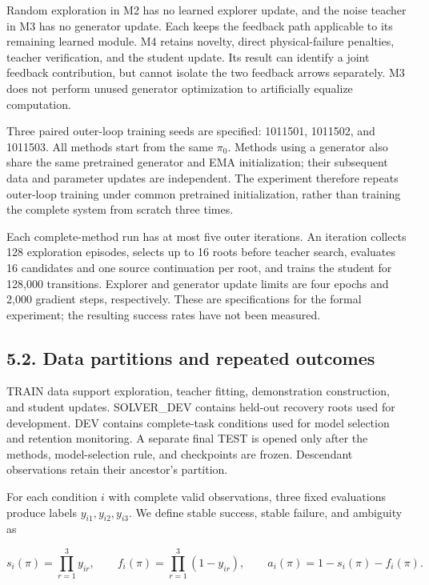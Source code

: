 \documentclass[
  american,
  11pt,
  a4paper,
]{article}
\begin{document}
Random exploration in M2 has no learned explorer update, and the noise
teacher in M3 has no generator update. Each keeps the feedback path
applicable to its remaining learned module. M4 retains novelty, direct
physical-failure penalties, teacher verification, and the student
update. Its result can identify a joint feedback contribution, but
cannot isolate the two feedback arrows separately. M3 does not perform
unused generator optimization to artificially equalize computation.

Three paired outer-loop training seeds are specified: 1011501, 1011502,
and 1011503. All methods start from the same \(\pi_0\). Methods using a
generator also share the same pretrained generator and EMA
initialization; their subsequent data and parameter updates are
independent. The experiment therefore repeats outer-loop training under
common pretrained initialization, rather than training the complete
system from scratch three times.

Each complete-method run has at most five outer iterations. An iteration
collects 128 exploration episodes, selects up to 16 roots before teacher
search, evaluates 16 candidates and one source continuation per root,
and trains the student for 128,000 transitions. Explorer and generator
update limits are four epochs and 2,000 gradient steps, respectively.
These are specifications for the formal experiment; the resulting
success rates have not been measured.

\subsection{5.2. Data partitions and repeated
outcomes}\label{data-partitions-and-repeated-outcomes}

TRAIN data support exploration, teacher fitting, demonstration
construction, and student updates. SOLVER\_DEV contains held-out
recovery roots used for development. DEV contains complete-task
conditions used for model selection and retention monitoring. A separate
final TEST is opened only after the methods, model-selection rule, and
checkpoints are frozen. Descendant observations retain their ancestor's
partition.

For each condition \(i\) with complete valid observations, three fixed
evaluations produce labels \(y_{i1},y_{i2},y_{i3}\). We define stable
success, stable failure, and ambiguity as

\[
s_i(\pi)=\prod_{r=1}^{3}y_{ir},\qquad
f_i(\pi)=\prod_{r=1}^{3}(1-y_{ir}),\qquad
a_i(\pi)=1-s_i(\pi)-f_i(\pi).
\tag{34}\label{eq:34}
\]
\end{document}
